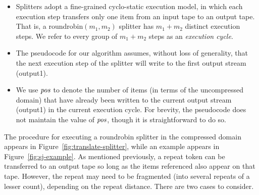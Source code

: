 \begin{itemize}

\item Splitters adopt a fine-grained cyclo-static
  execution model, in which each execution step transfers only one
  item from an input tape to an output tape.  That is, a
  roundrobin$(m_1, m_2)$ splitter has $m_1 + m_2$ distinct execution
  steps.  We refer to every group of $m_1 + m_2$ steps as an {\it
  execution cycle}.

\item The pseudocode for our algorithm assumes, without loss of 
  generality, that the next execution step of the splitter will 
  write to the first output stream (output1).

\item We use $\mbox{\it pos}$ to denote the number of items (in terms of the
  uncompressed domain) that have already been written to the current
  output stream (output1) in the current execution cycle.  For brevity,
  the pseudocode does not maintain the value of $\mbox{\it pos}$, though it is
  straightforward to do so.

\end{itemize}

The procedure for executing a roundrobin splitter in the compressed
domain appears in Figure~\ref{fig:translate-splitter}, while an
example appears in Figure~\ref{fig:sj-example}.  As mentioned
previously, a repeat token can be transferred to an output tape so
long as the items referenced also appear on that tape.  However, the
repeat may need to be fragmented (into several repeats of a lesser
count), depending on the repeat distance.  There are two cases to
consider.

